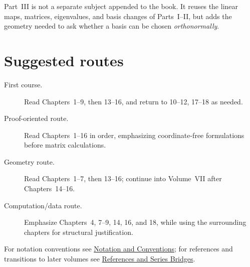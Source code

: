 Part~III is not a separate subject appended to the book. It reuses the linear
maps, matrices, eigenvalues, and basis changes of Parts~I--II, but adds the
geometry needed to ask whether a basis can be chosen \emph{orthonormally}.

\section*{Suggested routes}

\begin{description}
\item[First course.]
Read Chapters~1--9, then 13--16, and return to 10--12, 17--18 as needed.

\item[Proof-oriented route.]
Read Chapters~1--16 in order, emphasizing coordinate-free formulations before
matrix calculations.

\item[Geometry route.]
Read Chapters~1--7, then 13--16; continue into Volume~VII after Chapters~14--16.

\item[Computation/data route.]
Emphasize Chapters~4, 7--9, 14, 16, and 18, while using the surrounding
chapters for structural justification.
\end{description}

For notation conventions see
\hyperref[sec:i-notation-and-conventions]{Notation and Conventions}; for
references and transitions to later volumes see
\hyperref[sec:i-references-and-series-bridges]{References and Series Bridges}.
